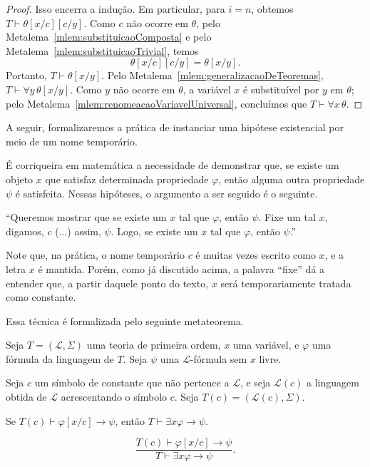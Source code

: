 \begin{proof}
    Isso encerra a indução.
    Em particular, para $i=n$, obtemos $T\vdash \theta[x/c][c/y]$.
    Como $c$ não ocorre em $\theta$, pelo Metalema~\ref{mlem:substituicaoComposta} e pelo Metalema~\ref{mlem:substituicaoTrivial}, temos
    \[
        \theta[x/c][c/y]=\theta[x/y].
    \]
    Portanto, $T\vdash \theta[x/y]$.
    Pelo Metalema~\ref{mlem:generalizacaoDeTeoremas}, $T\vdash \forall y\,\theta[x/y]$.
    Como $y$ não ocorre em $\theta$, a variável $x$ é substituível por $y$ em $\theta$; pelo Metalema~\ref{mlem:renomeacaoVariavelUniversal}, concluímos que $T\vdash \forall x\,\theta$.
\end{proof}

A seguir, formalizaremos a prática de instanciar uma hipótese existencial por meio de um nome temporário.

É corriqueira em matemática a necessidade de demonstrar que, se existe um objeto $x$ que satisfaz determinada propriedade $\varphi$, então alguma outra propriedade $\psi$ é satisfeita.
Nessas hipóteses, o argumento a ser seguido é o seguinte.

``Queremos mostrar que se existe um $x$ tal que $\varphi$, então $\psi$.
Fixe um tal $x$, digamos, $c$ (...) assim, $\psi$.
Logo, se existe um $x$ tal que $\varphi$, então $\psi$.''

Note que, na prática, o nome temporário $c$ é muitas vezes escrito como $x$, e a letra $x$ é mantida.
Porém, como já discutido acima, a palavra ``fixe'' dá a entender que, a partir daquele ponto do texto, $x$ será temporariamente tratada como constante.

Essa técnica é formalizada pelo seguinte metateorema.

\begin{metatheorem}\label{mthm:instanciacaoExistencial}
    Seja $T=(\mathcal L,\Sigma)$ uma teoria de primeira ordem, $x$ uma variável, e $\varphi$ uma fórmula da linguagem de $T$.
    Seja $\psi$ uma $\mathcal L$-fórmula sem $x$ livre.

    Seja $c$ um símbolo de constante que não pertence a $\mathcal L$, e seja $\mathcal L(c)$ a linguagem obtida de $\mathcal L$ acrescentando o símbolo $c$.
    Seja $T(c)=(\mathcal L(c),\Sigma)$.
    
    Se $T(c)\vdash \varphi[x/c]\rightarrow\psi$, então $T\vdash \exists x\varphi\rightarrow\psi$.

    \[
       \frac{T(c)\vdash \varphi[x/c]\rightarrow\psi}
             {T\vdash \exists x\varphi\rightarrow\psi}.
    \]
\end{metatheorem}

